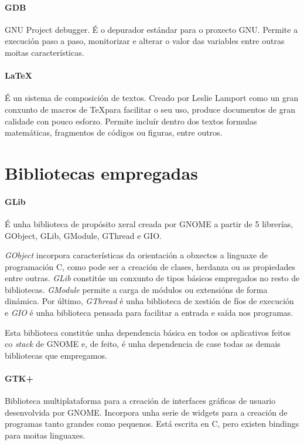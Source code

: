 \paragraph{GDB} GNU Project debugger. É o depurador estándar para o proxecto GNU. Permite a execución paso a paso, monitorizar e alterar o valor das variables entre outras moitas características.

\paragraph{\LaTeX} É un sistema de composición de textos. Creado por Leslie Lamport como un gran conxunto de macros de \TeX para facilitar o seu uso, produce documentos de gran calidade con pouco esforzo. Permite incluír dentro dos textos formulas matemáticas, fragmentos de códigos ou figuras, entre outros.

\section{Bibliotecas empregadas}

\paragraph{GLib} É unha biblioteca de propósito xeral creada por GNOME \cite{website:glibreference} a partir de 5 librerías, GObject, GLib, GModule, GThread e GIO.

\emph{GObject} incorpora características da orientación a obxectos a linguaxe de programación C, como pode ser a creación de clases, herdanza ou as propiedades entre outras. \emph{GLib} constitúe un conxunto de tipos básicos empregados no resto de bibliotecas. \emph{GModule} permite a carga de módulos ou extensións de forma dinámica. Por último, \emph{GThread} é unha biblioteca de xestión de fíos de execución e \emph{GIO} é unha biblioteca pensada para facilitar a entrada e saída nos programas.

Esta biblioteca constitúe unha dependencia básica en todos os aplicativos feitos co \emph{stack} de GNOME e, de feito, é unha dependencia de case todas as demais bibliotecas que empregamos.

\paragraph{GTK+} Biblioteca multiplataforma para a creación de interfaces gráficas de usuario desenvolvida por GNOME. Incorpora unha serie de widgets para a creación de programas tanto grandes como pequenos. Está escrita en C, pero existen bindings para moitas linguaxes.

